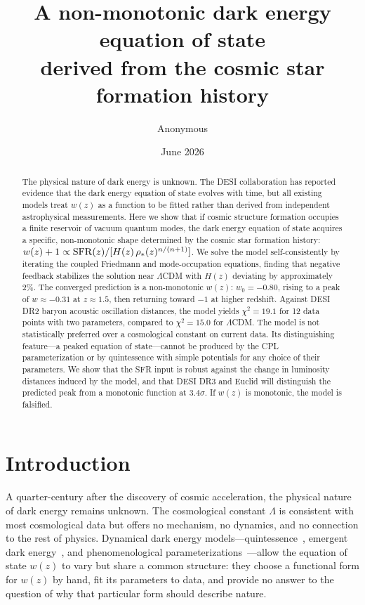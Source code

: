 \documentclass[12pt,a4paper]{article}
\begin{document}
\title{\bf A non-monotonic dark energy equation of state\\
derived from the cosmic star formation history}

\author{Anonymous}
\date{June 2026}

\maketitle

\begin{abstract}
The physical nature of dark energy is unknown. The DESI collaboration has reported evidence that the dark energy equation of state evolves with time, but all existing models treat $w(z)$ as a function to be fitted rather than derived from independent astrophysical measurements. Here we show that if cosmic structure formation occupies a finite reservoir of vacuum quantum modes, the dark energy equation of state acquires a specific, non-monotonic shape determined by the cosmic star formation history: $w(z)+1\propto{\rm SFR}(z)/[H(z)\,\rho_*(z)^{n/(n+1)}]$. We solve the model self-consistently by iterating the coupled Friedmann and mode-occupation equations, finding that negative feedback stabilizes the solution near $\Lambda$CDM with $H(z)$ deviating by approximately $2\%$. The converged prediction is a non-monotonic $w(z)$: $w_0=-0.80$, rising to a peak of $w\approx-0.31$ at $z\approx1.5$, then returning toward $-1$ at higher redshift. Against DESI DR2 baryon acoustic oscillation distances, the model yields $\chi^2=19.1$ for 12 data points with two parameters, compared to $\chi^2=15.0$ for $\Lambda$CDM. The model is not statistically preferred over a cosmological constant on current data. Its distinguishing feature---a peaked equation of state---cannot be produced by the CPL parameterization or by quintessence with simple potentials for any choice of their parameters. We show that the SFR input is robust against the change in luminosity distances induced by the model, and that DESI DR3 and Euclid will distinguish the predicted peak from a monotonic function at $3.4\sigma$. If $w(z)$ is monotonic, the model is falsified.
\end{abstract}

\section*{Introduction}

A quarter-century after the discovery of cosmic acceleration, the physical nature of dark energy remains unknown. The cosmological constant $\Lambda$ is consistent with most cosmological data but offers no mechanism, no dynamics, and no connection to the rest of physics. Dynamical dark energy models---quintessence~\cite{tsujikawa2013}, emergent dark energy~\cite{li2024}, and phenomenological parameterizations~\cite{chevallier2001}---allow the equation of state $w(z)$ to vary but share a common structure: they choose a functional form for $w(z)$ by hand, fit its parameters to data, and provide no answer to the question of why that particular form should describe nature.
\end{document}
